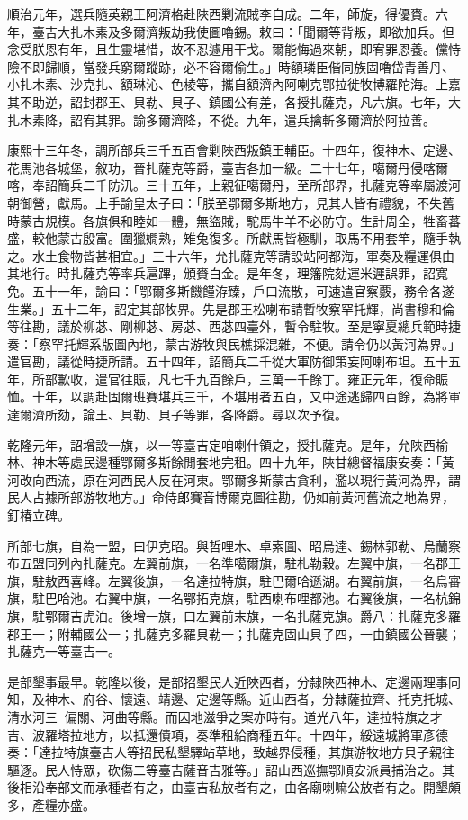 \begin{pinyinscope}
順治元年，選兵隨英親王阿濟格赴陜西剿流賊李自成。二年，師旋，得優賚。六年，臺吉大扎木素及多爾濟叛劫我使圖嚕錫。敕曰：「聞爾等背叛，即欲加兵。但念受朕恩有年，且生靈堪惜，故不忍遽用干戈。爾能悔過來朝，即宥罪恩養。儻恃險不即歸順，當發兵窮爾蹤跡，必不容爾偷生。」時額璘臣偕同族固嚕岱青善丹、小扎木素、沙克扎、額琳沁、色棱等，攜自額濟內阿喇克鄂拉徙牧博羅陀海。上嘉其不助逆，詔封郡王、貝勒、貝子、鎮國公有差，各授扎薩克，凡六旗。七年，大扎木素降，詔宥其罪。諭多爾濟降，不從。九年，遣兵擒斬多爾濟於阿拉善。

康熙十三年冬，調所部兵三千五百會剿陜西叛鎮王輔臣。十四年，復神木、定邊、花馬池各城堡，敘功，晉扎薩克等爵，臺吉各加一級。二十七年，噶爾丹侵喀爾喀，奉詔簡兵二千防汛。三十五年，上親征噶爾丹，至所部界，扎薩克等率屬渡河朝御營，獻馬。上手諭皇太子曰：「朕至鄂爾多斯地方，見其人皆有禮貌，不失舊時蒙古規模。各旗俱和睦如一體，無盜賊，駝馬牛羊不必防守。生計周全，牲畜蕃盛，較他蒙古殷富。圍獵嫺熟，雉兔復多。所獻馬皆極馴，取馬不用套竿，隨手執之。水土食物皆甚相宜。」三十六年，允扎薩克等請設站阿都海，軍奏及糧運俱由其地行。時扎薩克等率兵扈蹕，頒賚白金。是年冬，理籓院劾運米遲誤罪，詔寬免。五十一年，諭曰：「鄂爾多斯饑饉洊臻，戶口流散，可速遣官察覈，務令各遂生業。」五十二年，詔定其部牧界。先是郡王松喇布請暫牧察罕托輝，尚書穆和倫等往勘，議於柳苾、剛柳苾、房苾、西苾四臺外，暫令駐牧。至是寧夏總兵範時捷奏：「察罕托輝系版圖內地，蒙古游牧與民樵採混雜，不便。請令仍以黃河為界。」遣官勘，議從時捷所請。五十四年，詔簡兵二千從大軍防御策妄阿喇布坦。五十五年，所部歉收，遣官往賑，凡七千九百餘戶，三萬一千餘丁。雍正元年，復命賑恤。十年，以調赴固爾班賽堪兵三千，不堪用者五百，又中途逃歸四百餘，為將軍達爾濟所劾，論王、貝勒、貝子等罪，各降爵。尋以次予復。

乾隆元年，詔增設一旗，以一等臺吉定咱喇什領之，授扎薩克。是年，允陜西榆林、神木等處民邊種鄂爾多斯餘閒套地完租。四十九年，陜甘總督福康安奏：「黃河改向西流，原在河西民人反在河東。鄂爾多斯蒙古貪利，濫以現行黃河為界，謂民人占據所部游牧地方。」命侍郎賽音博爾克圖往勘，仍如前黃河舊流之地為界，釘椿立碑。

所部七旗，自為一盟，曰伊克昭。與哲哩木、卓索圖、昭烏達、錫林郭勒、烏蘭察布五盟同列內扎薩克。左翼前旗，一名準噶爾旗，駐札勒穀。左翼中旗，一名郡王旗，駐敖西喜峰。左翼後旗，一名達拉特旗，駐巴爾哈遜湖。右翼前旗，一名烏審旗，駐巴哈池。右翼中旗，一名鄂拓克旗，駐西喇布哩都池。右翼後旗，一名杭錦旗，駐鄂爾吉虎泊。後增一旗，曰左翼前末旗，一名扎薩克旗。爵八：扎薩克多羅郡王一；附輔國公一；扎薩克多羅貝勒一；扎薩克固山貝子四，一由鎮國公晉襲；扎薩克一等臺吉一。

是部墾事最早。乾隆以後，是部招墾民人近陜西者，分隸陜西神木、定邊兩理事同知，及神木、府谷、懷遠、靖邊、定邊等縣。近山西者，分隸薩拉齊、托克托城、清水河三，偏關、河曲等縣。而因地滋爭之案亦時有。道光八年，達拉特旗之才吉、波羅塔拉地方，以抵還債項，奏準租給商種五年。十四年，綏遠城將軍彥德奏：「達拉特旗臺吉人等招民私墾驛站草地，致越界侵種，其旗游牧地方貝子親往驅逐。民人恃眾，砍傷二等臺吉薩音吉雅等。」詔山西巡撫鄂順安派員捕治之。其後相沿奉部文而承種者有之，由臺吉私放者有之，由各廟喇嘛公放者有之。開墾頗多，產糧亦盛。


\end{pinyinscope}
